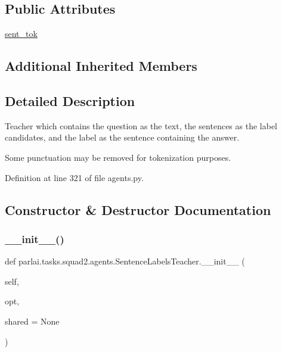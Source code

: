 \subsection*{Public Attributes}
\begin{DoxyCompactItemize}
\item 
\hyperlink{classparlai_1_1tasks_1_1squad2_1_1agents_1_1SentenceLabelsTeacher_a38eaa848e9051e5fb1b0a63f2308481e}{sent\+\_\+tok}
\end{DoxyCompactItemize}
\subsection*{Additional Inherited Members}


\subsection{Detailed Description}
\begin{DoxyVerb}Teacher which contains the question as the text, the sentences as the
label candidates, and the label as the sentence containing the answer.

Some punctuation may be removed for tokenization purposes.
\end{DoxyVerb}
 

Definition at line 321 of file agents.\+py.



\subsection{Constructor \& Destructor Documentation}
\mbox{\label{classparlai_1_1tasks_1_1squad2_1_1agents_1_1SentenceLabelsTeacher_acc15b4caefa5b72697761981c39873dc}} 
\subsubsection{\texorpdfstring{\+\_\+\+\_\+init\+\_\+\+\_\+()}{\_\_init\_\_()}}
{\footnotesize\ttfamily def parlai.\+tasks.\+squad2.\+agents.\+Sentence\+Labels\+Teacher.\+\_\+\+\_\+init\+\_\+\+\_\+ (\begin{DoxyParamCaption}\item[{}]{self,  }\item[{}]{opt,  }\item[{}]{shared = {\ttfamily None} }\end{DoxyParamCaption})}



